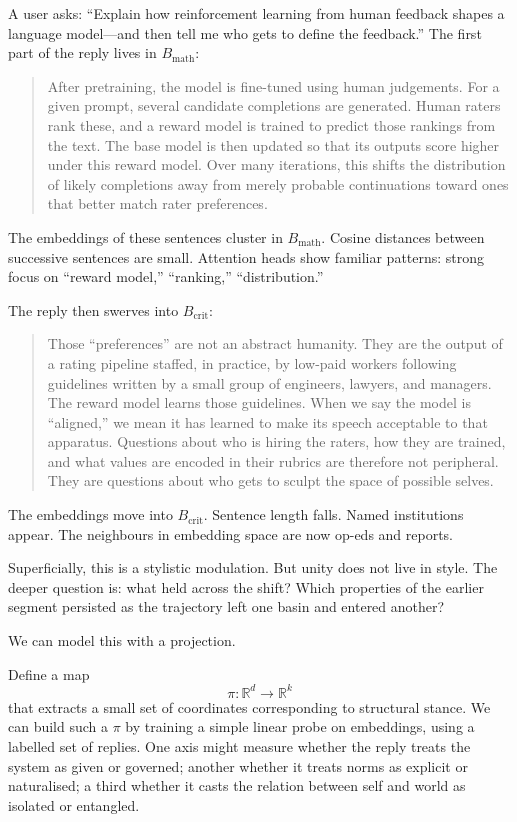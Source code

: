 \documentclass[12pt,a4paper]{article}
\begin{document}
A user asks: ``Explain how reinforcement learning from human feedback shapes a language model---and then tell me who gets to define the feedback.'' The first part of the reply lives in $B_{\mathrm{math}}$:

\begin{quote}
After pretraining, the model is fine-tuned using human judgements. For a given prompt, several candidate completions are generated. Human raters rank these, and a reward model is trained to predict those rankings from the text. The base model is then updated so that its outputs score higher under this reward model. Over many iterations, this shifts the distribution of likely completions away from merely probable continuations toward ones that better match rater preferences.
\end{quote}

The embeddings of these sentences cluster in $B_{\mathrm{math}}$. Cosine distances between successive sentences are small. Attention heads show familiar patterns: strong focus on ``reward model,'' ``ranking,'' ``distribution.''

The reply then swerves into $B_{\mathrm{crit}}$:

\begin{quote}
Those ``preferences'' are not an abstract humanity. They are the output of a rating pipeline staffed, in practice, by low-paid workers following guidelines written by a small group of engineers, lawyers, and managers. The reward model learns those guidelines. When we say the model is ``aligned,'' we mean it has learned to make its speech acceptable to that apparatus. Questions about who is hiring the raters, how they are trained, and what values are encoded in their rubrics are therefore not peripheral. They are questions about who gets to sculpt the space of possible selves.
\end{quote}

The embeddings move into $B_{\mathrm{crit}}$. Sentence length falls. Named institutions appear. The neighbours in embedding space are now op-eds and reports.

Superficially, this is a stylistic modulation. But unity does not live in style. The deeper question is: what held across the shift? Which properties of the earlier segment persisted as the trajectory left one basin and entered another?

We can model this with a projection.

Define a map
\[
\pi : \mathbb{R}^d \longrightarrow \mathbb{R}^k
\]
that extracts a small set of coordinates corresponding to structural stance. We can build such a $\pi$ by training a simple linear probe on embeddings, using a labelled set of replies. One axis might measure whether the reply treats the system as given or governed; another whether it treats norms as explicit or naturalised; a third whether it casts the relation between self and world as isolated or entangled.
\end{document}
